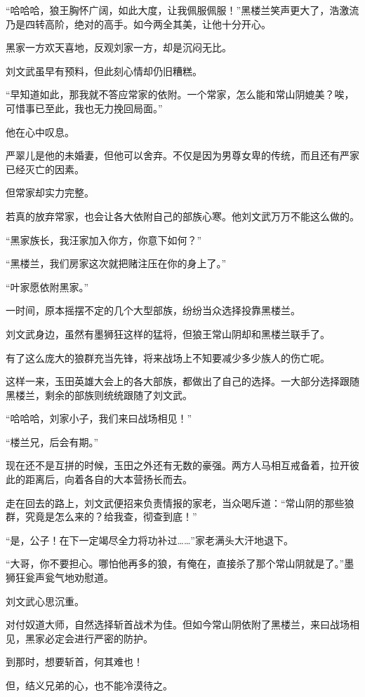 \begin{this_body}
“哈哈哈，狼王胸怀广阔，如此大度，让我佩服佩服！”黑楼兰笑声更大了，浩激流乃是四转高阶，绝对的高手。如今两全其美，让他十分开心。

黑家一方欢天喜地，反观刘家一方，却是沉闷无比。

刘文武虽早有预料，但此刻心情却仍旧糟糕。

“早知道如此，那我就不答应常家的依附。一个常家，怎么能和常山阴媲美？唉，可惜事已至此，我也无力挽回局面。”

他在心中叹息。

严翠儿是他的未婚妻，但他可以舍弃。不仅是因为男尊女卑的传统，而且还有严家已经灭亡的因素。

但常家却实力完整。

若真的放弃常家，也会让各大依附自己的部族心寒。他刘文武万万不能这么做的。

“黑家族长，我汪家加入你方，你意下如何？”

“黑楼兰，我们房家这次就把赌注压在你的身上了。”

“叶家愿依附黑家。”

一时间，原本摇摆不定的几个大型部族，纷纷当众选择投靠黑楼兰。

刘文武身边，虽然有墨狮狂这样的猛将，但狼王常山阴却和黑楼兰联手了。

有了这么庞大的狼群充当先锋，将来战场上不知要减少多少族人的伤亡呢。

这样一来，玉田英雄大会上的各大部族，都做出了自己的选择。一大部分选择跟随黑楼兰，剩余的部族则统统跟随了刘文武。

“哈哈哈，刘家小子，我们来曰战场相见！”

“楼兰兄，后会有期。”

现在还不是互拼的时候，玉田之外还有无数的豪强。两方人马相互戒备着，拉开彼此的距离后，向着各自的大本营扬长而去。

走在回去的路上，刘文武便招来负责情报的家老，当众喝斥道：“常山阴的那些狼群，究竟是怎么来的？给我查，彻查到底！”

“是，公子！在下一定竭尽全力将功补过……”家老满头大汗地退下。

“大哥，你不要担心。哪怕他再多的狼，有俺在，直接杀了那个常山阴就是了。”墨狮狂瓮声瓮气地劝慰道。

刘文武心思沉重。

对付奴道大师，自然选择斩首战术为佳。但如今常山阴依附了黑楼兰，来曰战场相见，黑家必定会进行严密的防护。

到那时，想要斩首，何其难也！

但，结义兄弟的心，也不能冷漠待之。


\end{this_body}
